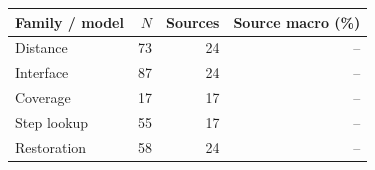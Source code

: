 \begin{tabular}{lrrr}
\toprule
Family / model & $N$ & Sources & Source macro (\%) \\
\midrule
Distance & 73 & 24 & -- \\
Interface & 87 & 24 & -- \\
Coverage & 17 & 17 & -- \\
Step lookup & 55 & 17 & -- \\
Restoration & 58 & 24 & -- \\
\bottomrule
\end{tabular}
